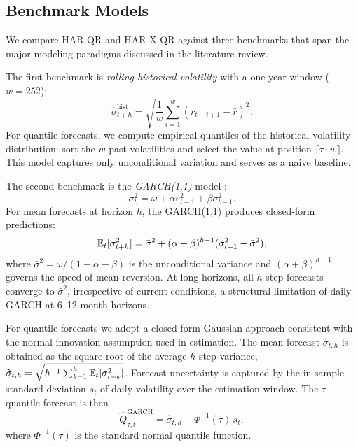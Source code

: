 \subsection{Benchmark Models}
\label{sec:meth-benchmarks}

We compare HAR-QR and HAR-X-QR against three benchmarks that span the major modeling
paradigms discussed in the literature review.

The first benchmark is \emph{rolling historical volatility} with a one-year
window ($w = 252$):
\begin{equation}
\label{eq:hist-vol}
\hat{\sigma}_{t+h}^{\text{hist}} = \sqrt{\frac{1}{w} \sum_{i=1}^{w} (r_{t-i+1} - \bar{r})^2}.
\end{equation}
For quantile forecasts, we compute empirical quantiles of the historical
volatility distribution: sort the $w$ past volatilities and select the
value at position $\lceil \tau \cdot w \rceil$. This model captures only
unconditional variation and serves as a naive baseline.

The second benchmark is the \emph{GARCH(1,1)} model
\parencite{bollerslev1986generalized}:
\begin{equation}
\label{eq:garch}
\sigma_t^2 = \omega + \alpha \varepsilon_{t-1}^2 + \beta \sigma_{t-1}^2.
\end{equation}
For mean forecasts at horizon $h$, the GARCH(1,1) produces closed-form
predictions:
\begin{equation}
\label{eq:garch-forecast}
\mathbb{E}_t[\sigma_{t+h}^2] = \bar{\sigma}^2 + (\alpha + \beta)^{h-1}(\sigma_{t+1}^2 - \bar{\sigma}^2),
\end{equation}
where $\bar{\sigma}^2 = \omega / (1 - \alpha - \beta)$ is the unconditional
variance and $(\alpha + \beta)^{h-1}$ governs the speed of mean reversion.
At long horizons, all $h$-step forecasts converge to $\bar{\sigma}^2$,
irrespective of current conditions, a structural limitation of daily
GARCH at 6--12 month horizons.

For quantile forecasts we adopt a closed-form Gaussian approach consistent
with the normal-innovation assumption used in estimation.
The mean forecast $\hat{\sigma}_{t,h}$ is obtained as the square root of
the average $h$-step variance, $\hat{\sigma}_{t,h} = \sqrt{h^{-1}\sum_{k=1}^{h}\mathbb{E}_t[\sigma_{t+k}^2]}$.
Forecast uncertainty is captured by the in-sample standard deviation
$s_t$ of daily volatility over the estimation window. The $\tau$-quantile
forecast is then
\begin{equation}
\label{eq:garch-quantile}
\hat{Q}_{\tau,t}^{\text{GARCH}} = \hat{\sigma}_{t,h} + \Phi^{-1}(\tau)\, s_t,
\end{equation}
where $\Phi^{-1}(\tau)$ is the standard normal quantile function.

